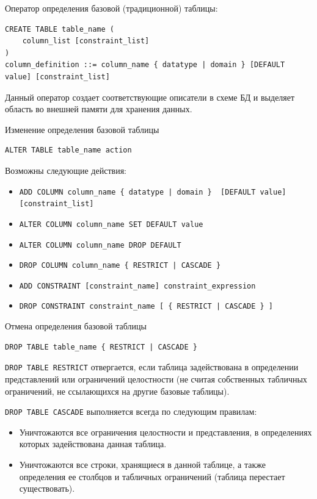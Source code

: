 \documentclass[a4paper,12pt]{article}
\begin{document}
Оператор определения базовой (традиционной) таблицы:  
\begin{lstlisting}
CREATE TABLE table_name (
    column_list [constraint_list]
)
column_definition ::= column_name { datatype | domain } [DEFAULT value] [constraint_list]
\end{lstlisting}

Данный оператор создает соответствующие описатели в схеме БД и выделяет область во внешней памяти для хранения данных.

Изменение определения базовой таблицы  
\begin{lstlisting}
ALTER TABLE table_name action
\end{lstlisting}

Возможны следующие действия:  
\begin{itemize}
    \item \texttt{ADD COLUMN column\_name \{ datatype | domain \} \ [DEFAULT value] [constraint\_list]}
    \item \texttt{ALTER COLUMN column\_name SET DEFAULT value}
    \item \texttt{ALTER COLUMN column\_name DROP DEFAULT}
    \item \texttt{DROP COLUMN column\_name \{ RESTRICT | CASCADE \}}
    \item \texttt{ADD CONSTRAINT [constraint\_name] constraint\_expression}
    \item \texttt{DROP CONSTRAINT constraint\_name [ \{ RESTRICT | CASCADE \} ]}
\end{itemize}

Отмена определения базовой таблицы  
\begin{lstlisting}
DROP TABLE table_name { RESTRICT | CASCADE }
\end{lstlisting}

\texttt{DROP TABLE RESTRICT} отвергается, если таблица задействована в определении представлений или ограничений целостности (не считая собственных табличных ограничений, не ссылающихся на другие базовые таблицы).

\texttt{DROP TABLE CASCADE} выполняется всегда по следующим правилам:
\begin{itemize}
    \item Уничтожаются все ограничения целостности и представления, в определениях которых задействована данная таблица.
    \item Уничтожаются все строки, хранящиеся в данной таблице, а также определения ее столбцов и табличных ограничений (таблица перестает существовать).
\end{itemize}
\end{document}
